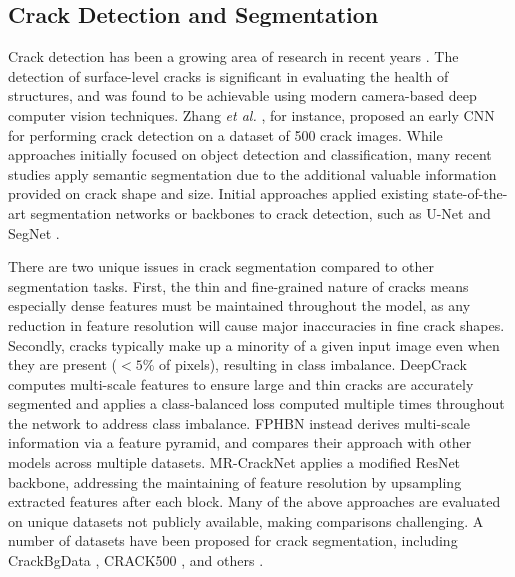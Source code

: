 \documentclass[a4paper,12pt]{report}
\begin{document}
    \subsection{Crack Detection and Segmentation}
    Crack detection has been a growing area of research in recent years \cite{hamishebahar_comprehensive_2022}. 
    The detection of surface-level cracks is significant in evaluating the health of structures, and was found to be achievable using modern camera-based deep computer vision techniques. 
    Zhang \textit{et al.} \cite{zhang2016road}, for instance, proposed an early CNN for performing crack detection on a dataset of 500 crack images. While approaches initially focused on object detection and classification, many recent studies apply semantic segmentation \cite{hamishebahar_comprehensive_2022} due to the additional valuable information provided on crack shape and size. Initial approaches applied existing state-of-the-art segmentation networks or backbones to crack detection, such as U-Net \cite{david_jenkins_deep_2018} and SegNet \cite{chen_pavement_2020}.

    There are two unique issues in crack segmentation compared to other segmentation tasks. First, the thin and fine-grained nature of cracks means especially dense features must be maintained throughout the model, as any reduction in feature resolution will cause major inaccuracies in fine crack shapes. Secondly, cracks typically make up a minority of a given input image even when they are present ($<5\%$ of pixels), resulting in class imbalance. DeepCrack \cite{liu2019deepcrack} computes multi-scale features to ensure large and thin cracks are accurately segmented and applies a class-balanced loss computed multiple times throughout the network to address class imbalance. FPHBN \cite{yang2019feature} instead derives multi-scale information via a feature pyramid, and compares their approach with other models across multiple datasets. MR-CrackNet \cite{nayyeri2021multi} applies a modified ResNet \cite{he_deep_2015} backbone, addressing the maintaining of feature resolution by upsampling extracted features after each block.
    Many of the above approaches are evaluated on unique datasets not publicly available, making comparisons challenging. A number of datasets have been proposed for crack segmentation, including CrackBgData \cite{nayyeri2021multi}, CRACK500 \cite{yang_feature_2019}, and others \cite{eisenbach2017how} \cite{shi2016automatic} \cite{amhaz2016automatic} \cite{zou2012cracktree}.
\end{document}
